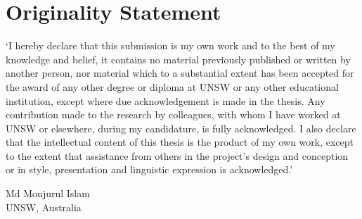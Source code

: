 
\chapter*{Originality Statement}
\pagestyle{plain}

`I hereby declare that this submission is my own work and to the best of my knowledge and belief, it contains no material previously published or written by another person, nor material which to a substantial extent has been accepted for the award of any other degree or diploma at UNSW or any other educational institution, except where due acknowledgement is made in the thesis. Any contribution made to
the research by colleagues, with whom I have worked at UNSW or elsewhere, during my candidature, is fully acknowledged. I also declare that the intellectual content of this thesis is the product of my own work, except to the extent that assistance from others in the project's design and conception or in style, presentation and linguistic expression is acknowledged.'

\vspace{60pt}

\begin{flushright}
Md Monjurul Islam \\
UNSW, Australia
\end{flushright}
